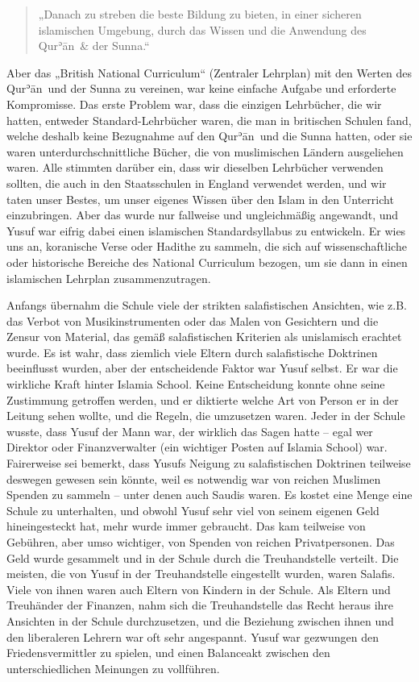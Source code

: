 \documentclass[12pt]{memoir}
\def\´{ʾ} %
\def \Quran{Qur\-\´ān} %
\begin{document}
\begin{quote}
„Danach zu streben die beste Bildung zu bieten,
in einer sicheren islamischen Umgebung,
durch das Wissen und die Anwendung des \Quran\ \& der Sunna.“
\end{quote}

Aber das „British National Curriculum“ (Zentraler Lehrplan)
mit den Werten des \Quran\ und der Sunna zu vereinen,
war keine einfache Aufgabe und erforderte Kompromisse.
Das erste Problem war, dass die einzigen Lehrbücher, die wir hatten,
entweder Standard-Lehrbücher waren, die man in britischen Schulen fand,
welche deshalb keine Bezugnahme auf den \Quran\ und die Sunna hatten,
oder sie waren unterdurchschnittliche Bücher,
die von muslimischen Ländern ausgeliehen waren.
Alle stimmten darüber ein, dass wir dieselben Lehrbücher verwenden sollten,
die auch in den Staatsschulen in England verwendet werden,
und wir taten unser Bestes,
um unser eigenes Wissen über den Islam in den Unterricht einzubringen.
Aber das wurde nur fallweise und ungleichmäßig angewandt,
und Yusuf war eifrig dabei einen islamischen Standardsyllabus zu entwickeln.
Er wies uns an, koranische Verse oder Hadithe zu sammeln,
die sich auf wissenschaftliche oder historische Bereiche
des National Curriculum bezogen,
um sie dann in einen islamischen Lehrplan zusammenzutragen.

Anfangs übernahm die Schule viele der strikten salafistischen Ansichten,
wie z.B. das Verbot von Musikinstrumenten oder das Malen von Gesichtern
und die Zensur von Material, das gemäß salafistischen Kriterien
als unislamisch erachtet wurde.
Es ist wahr, dass ziemlich viele Eltern durch salafistische Doktrinen
beeinflusst wurden, aber der entscheidende Faktor war Yusuf selbst.
Er war die wirkliche Kraft hinter Islamia School.
Keine Entscheidung konnte ohne seine Zustimmung getroffen werden,
und er diktierte welche Art von Person er in der Leitung sehen wollte,
und die Regeln, die umzusetzen waren.
Jeder in der Schule wusste, dass Yusuf der Mann war,
der wirklich das Sagen hatte –
egal wer Direktor oder Finanzverwalter
(ein wichtiger Posten auf Islamia School) war.
Fairerweise sei bemerkt, dass Yusufs Neigung zu salafistischen Doktrinen
teilweise deswegen gewesen sein könnte,
weil es notwendig war von reichen Muslimen Spenden zu sammeln –
unter denen auch Saudis waren.
Es kostet eine Menge eine Schule zu unterhalten,
und obwohl Yusuf sehr viel von seinem eigenen Geld hineingesteckt hat,
mehr wurde immer gebraucht.
Das kam teilweise von Gebühren, aber umso wichtiger,
von Spenden von reichen Privatpersonen.
Das Geld wurde gesammelt und in der Schule durch die Treuhandstelle verteilt.
Die meisten, die von Yusuf in der Treuhandstelle eingestellt wurden,
waren Salafis.
Viele von ihnen waren auch Eltern von Kindern in der Schule.
Als Eltern und Treuhänder der Finanzen,
nahm sich die Treuhandstelle das Recht heraus
ihre Ansichten in der Schule durchzusetzen,
und die Beziehung zwischen ihnen und den liberaleren Lehrern
war oft sehr angespannt.
Yusuf war gezwungen den Friedensvermittler zu spielen,
und einen Balanceakt zwischen den unterschiedlichen Meinungen zu vollführen.
\end{document}

